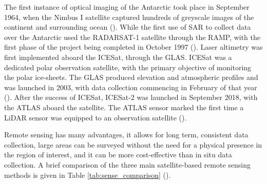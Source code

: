 The first instance of optical imaging of the Antarctic took place in September 1964, when the Nimbus I satellite captured hundreds of greyscale images of the continent and surrounding ocean (\cite{meierNewEstimatesArctic2013}).
While the first use of \ac{SAR} to collect data over the Antarctic used the RADARSAT-1 satellite through the \ac{RAMP}, with the first phase of the project being completed in October 1997 (\cite{jezekRADARSAT1AntarcticMapping2002}).
Laser altimetry was first implemented aboard the \ac{ICESat}, through the \ac{GLAS}. \ac{ICESat} was a dedicated polar observation satellite, with the primary objective of monitoring the polar ice-sheets. The \ac{GLAS} produced elevation and atmospheric profiles and was launched in 2003, with data collection commencing in February of that year (\cite{schutzOverviewICESatMission2005}).
After the success of \ac{ICESat}, ICESat-2 was launched in September 2018, with the \ac{ATLAS} aboard the satellite. The \ac{ATLAS} sensor marked the first time a \ac{LiDAR} sensor was equipped to an observation satellite (\cite{palmICESat2AtmosphericChannel2021}).

Remote sensing has many advantages, it allows for long term, consistent data collection, large areas can be surveyed without the need for a physical presence in the region of interest, and it can be more cost-effective than in situ data collection. A brief comparison of the three main satellite-based remote sensing methods is given in Table \ref{tab:sense_comparison} (\cite{agrawalComparativeAssesmentRemote2019}).

